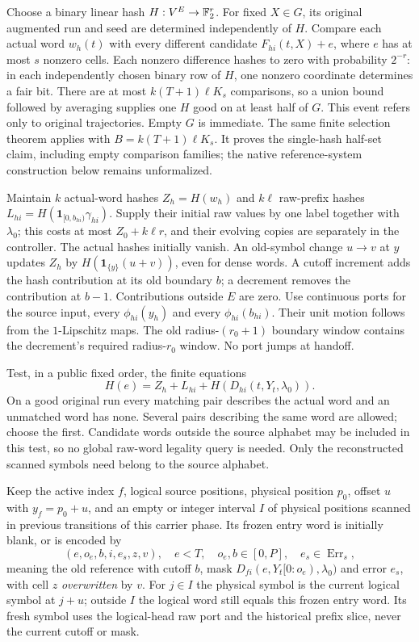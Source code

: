 \begin{informalproof}
Choose a binary linear hash $H:V^E\to\mathbb{F}_2^r$. For fixed $X\in G$, its
original augmented run and seed are determined independently of $H$.
Compare each actual word $w_h(t)$ with every different candidate
$F_{hi}(t,X)+e$, where $e$ has at most $s$ nonzero cells. Each nonzero
difference hashes to zero with probability $2^{-r}$: in each independently
chosen binary row of $H$, one nonzero coordinate determines a fair bit.
There are at most $k(T+1)\ell K_s$ comparisons, so a union bound followed
by averaging supplies one $H$ good on at least half of $G$.
This event refers only to original trajectories. Empty $G$ is immediate.
The same finite selection theorem  applies
with $B=k(T+1)\ell K_s$. It proves the single-hash half-set claim, including
empty comparison families; the native reference-system construction below
remains unformalized.

Maintain $k$ actual-word hashes $Z_h=H(w_h)$ and $k\ell$ raw-prefix
hashes $L_{hi}=H(\mathbf1_{[0,b_{hi})}\gamma_{hi})$. Supply their initial
raw values by one label together with $\lambda_0$; this costs at most
$Z_0+k\ell r$, and their evolving copies are separately in the controller.
The actual hashes initially vanish. An old-symbol change $u\to v$ at $y$
updates $Z_h$ by $H(\mathbf1_{\{y\}}(u+v))$, even for dense words.
A cutoff increment adds the hash contribution at its old boundary $b$;
a decrement removes the contribution at $b-1$. Contributions outside $E$
are zero. Use continuous ports for the source input, every $\phi_{hi}(y_h)$
and every $\phi_{hi}(b_{hi})$. Their unit motion follows from the
$1$-Lipschitz maps. The old radius-$(r_0+1)$ boundary window contains the
decrement's required radius-$r_0$ window. No port jumps at handoff.

Test, in a public fixed order, the finite equations
\[
 H(e)=Z_h+L_{hi}+H(D_{hi}(t,Y_t,\lambda_0)).
\]
On a good original run every matching pair describes the actual word and
an unmatched word has none. Several pairs describing the same word are
allowed; choose the first. Candidate words outside the source alphabet may
be included in this test, so no global raw-word legality query is needed.
Only the reconstructed scanned symbols need belong to the source alphabet.

Keep the active index $f$, logical source positions, physical position $p_0$,
offset $u$ with $y_f=p_0+u$, and an empty or integer interval $I$ of physical
positions scanned in previous transitions of this carrier phase. Its frozen
entry word is initially blank, or is encoded by
\[
 (e,o_e,b,i,e_s,z,v),\quad e<T,\quad o_e,b\in[0,P],
 \quad e_s\in\operatorname{Err}_s,
\]
meaning the old reference with cutoff $b$, mask
$D_{fi}(e,Y_t[0:o_e),\lambda_0)$ and error $e_s$, with cell $z$
\emph{overwritten} by $v$. For $j\in I$ the physical symbol is the current
logical symbol at $j+u$; outside $I$ the logical word still equals this
frozen entry word. Its fresh symbol uses the logical-head raw port and
the historical prefix slice, never the current cutoff or mask.


\end{informalproof}
